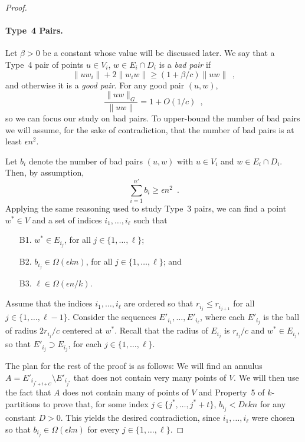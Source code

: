 \documentclass{patmorin}
\begin{document}
\begin{proof}
  \paragraph{Type~4 Pairs.}  
  Let $\beta > 0$ be a constant whose value will be discussed later.
  We say that a Type~4 pair of points $u\in V_i$, $w\in E_i\cap D_i$ is
  a \emph{bad pair} if
  \[
      \|uw_i\|+2\|w_iw\| \ge (1+\beta/c)\|uw\| \enspace ,
  \]
  and otherwise it is a \emph{good pair}.  For any good pair $(u,w)$,
  \[
    \frac{\|uw\|_G}{\|uw\|} = 1+O(1/c) \enspace ,
  \]
  so we can focus our study on bad pairs.  To upper-bound the number
  of bad pairs we will assume, for the sake of contradiction, that the
  number of bad pairs is at least $\epsilon n^2$.

  Let $b_i$ denote the number of bad pairs $(u,w)$ with $u\in V_i$
  and $w\in E_i\cap D_i$.  Then, by assumption,
  \[
    \sum_{i=1}^{n'} b_i \ge \epsilon n^2 \enspace .
  \]
  Applying the same reasoning used to study Type~3 pairs, we can find a
  point $w^*\in V$ and a set of indices $i_1,\ldots,i_{\ell}$ such that
  \begin{enumerate}\label{w-star}
    \item[B1.] $w^*\in E_{i_j}$, for all $j\in\{1,\ldots,\ell\}$;
    \item[B2.] $b_{i_j} \in \Omega(\epsilon kn)$, for all 
       $j\in\{1,\ldots,\ell\}$; and
    \item[B3.] $\ell\in \Omega(\epsilon n/k)$.
  \end{enumerate}

  Assume that the indices $i_1,\ldots,i_\ell$ are ordered so that
  $r_{i_j}\le r_{i_{j+1}}$ for all $j\in\{1,\ldots,\ell-1\}$.  Consider
  the sequences $E'_{i_1},\ldots,E'_{i_\ell}$, where each $E'_{i_j}$
  is the ball of radius $2r_{i_j}/c$ centered at $w^*$. Recall that
  the radius of $E_{i_j}$ is $r_{i_j}/c$ and $w^*\in E_{i_j}$, so that
  $E'_{i_j}\supset E_{i_j}$, for each $j\in\{1,\ldots,\ell\}$.

  The plan for the rest of the proof is as follows:  We will find an
  annulus $A=E'_{i_{j^*+t+C}}\setminus E'_{i_{j^*}}$ that does not contain
  very many points of $V$.  We will then use the fact that $A$ does not
  contain many of points of $V$ and Property~5 of $k$-partitions to prove
  that, for some index $j\in\{j^*,\ldots,j^*+t\}$, $b_{i_j}< D\epsilon kn$
  for any constant $D>0$.  This yields the desired contradiction, since
  $i_1,\ldots,i_\ell$ were chosen so that $b_{i_j}\in\Omega(\epsilon k n)$
  for every $j\in\{1,\ldots,\ell\}$.


\end{proof}
\end{document}

